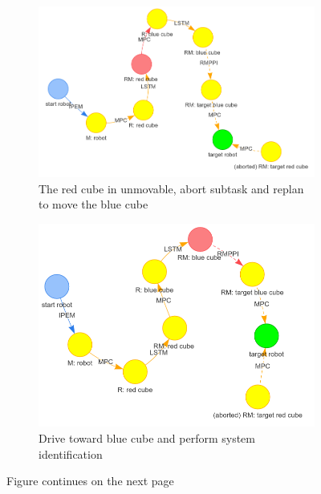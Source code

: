 \begin{figure}[H]
\begin{subfigure}[b]{0.49\textwidth}
         \includegraphics[width=1\textwidth]{figures/surrounded/5.png}
         \caption{The red cube in unmovable, abort subtask and replan to move the blue cube}
     \end{subfigure}
     \hfill
     \begin{subfigure}[b]{0.49\textwidth}
         \centering
         \includegraphics[width=\textwidth]{figures/surrounded/6.png}
         \caption{Drive toward blue cube and perform system identification}
     \end{subfigure}
     \caption{Figure continues on the next page}
\end{figure}

